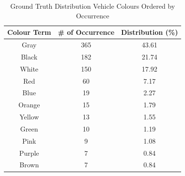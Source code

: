 \begin{table}[tb!]
\centering
\caption{Ground Truth Distribution Vehicle Colours Ordered by Occurrence}
\label{table:colorDist}
\begin{tabular}{ccc}
\toprule
Colour Term & \# of Occurrence & Distribution (\%)   \\
\midrule
Gray       & 365       & 43.61  \\
Black      & 182       & 21.74  \\
White      & 150       & 17.92  \\
Red        & 60        & 7.17   \\
Blue       & 19        & 2.27   \\
Orange     & 15        & 1.79   \\
Yellow     & 13        & 1.55   \\
Green      & 10        & 1.19   \\
Pink       & 9         & 1.08   \\
Purple     & 7         & 0.84   \\
Brown      & 7         & 0.84   \\
\bottomrule
\end{tabular}
\end{table}
